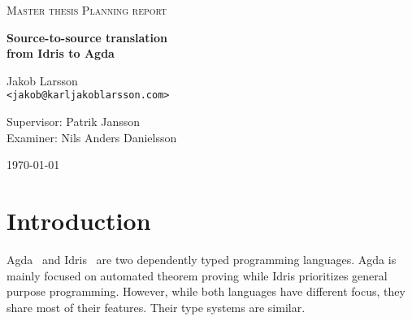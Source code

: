 \documentclass[parskip=half]{scrartcl}
\begin{document}
\begin{titlepage}

\centering
{\scshape\LARGE Master thesis Planning report}


\vspace{0.5cm}
{\huge\bfseries Source-to-source translation\\ from Idris to Agda
  }

\vspace{2cm}
{\Large Jakob Larsson\\}
\texttt{<jakob@karljakoblarsson.com>}

\vspace{1.0cm}
{\large Supervisor: Patrik Jansson  \\
        Examiner: Nils Anders Danielsson}

\vspace{1.5cm}

\vfill
{\large \today}

\end{titlepage}

%
%


\section{Introduction}

Agda~\cite{agda} and Idris~\cite{idris} are two dependently typed programming
languages.  Agda is mainly focused on automated theorem proving while Idris
prioritizes general purpose programming.  However, while both languages have
different focus, they share most of their features. Their type systems are
similar.

\end{document}
